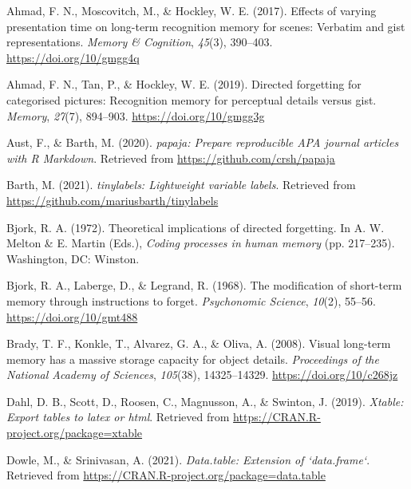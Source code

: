 \documentclass[
  english,
  man,floatsintext]{apa6}
\begin{document}
\begingroup
\setlength{\parindent}{-0.5in}
\setlength{\leftskip}{0.5in}

\hypertarget{refs}{}
\leavevmode\hypertarget{ref-ahmadEffectsVaryingPresentation2017}{}%
Ahmad, F. N., Moscovitch, M., \& Hockley, W. E. (2017). Effects of varying presentation time on long-term recognition memory for scenes: Verbatim and gist representations. \emph{Memory \& Cognition}, \emph{45}(3), 390--403. \url{https://doi.org/10/gmgg4q}

\leavevmode\hypertarget{ref-ahmadDirectedForgettingCategorised2019}{}%
Ahmad, F. N., Tan, P., \& Hockley, W. E. (2019). Directed forgetting for categorised pictures: Recognition memory for perceptual details versus gist. \emph{Memory}, \emph{27}(7), 894--903. \url{https://doi.org/10/gmgg3g}

\leavevmode\hypertarget{ref-R-papaja}{}%
Aust, F., \& Barth, M. (2020). \emph{papaja: Prepare reproducible APA journal articles with R Markdown}. Retrieved from \url{https://github.com/crsh/papaja}

\leavevmode\hypertarget{ref-R-tinylabels}{}%
Barth, M. (2021). \emph{tinylabels: Lightweight variable labels}. Retrieved from \url{https://github.com/mariusbarth/tinylabels}

\leavevmode\hypertarget{ref-bjorkTheoreticalImplicationsDirected1972}{}%
Bjork, R. A. (1972). Theoretical implications of directed forgetting. In A. W. Melton \& E. Martin (Eds.), \emph{Coding processes in human memory} (pp. 217--235). Washington, DC: Winston.

\leavevmode\hypertarget{ref-bjorkModificationShorttermMemory1968}{}%
Bjork, R. A., Laberge, D., \& Legrand, R. (1968). The modification of short-term memory through instructions to forget. \emph{Psychonomic Science}, \emph{10}(2), 55--56. \url{https://doi.org/10/gmt488}

\leavevmode\hypertarget{ref-bradyVisualLongtermMemory2008}{}%
Brady, T. F., Konkle, T., Alvarez, G. A., \& Oliva, A. (2008). Visual long-term memory has a massive storage capacity for object details. \emph{Proceedings of the National Academy of Sciences}, \emph{105}(38), 14325--14329. \url{https://doi.org/10/c268jz}

\leavevmode\hypertarget{ref-R-xtable}{}%
Dahl, D. B., Scott, D., Roosen, C., Magnusson, A., \& Swinton, J. (2019). \emph{Xtable: Export tables to latex or html}. Retrieved from \url{https://CRAN.R-project.org/package=xtable}

\leavevmode\hypertarget{ref-R-data.table}{}%
Dowle, M., \& Srinivasan, A. (2021). \emph{Data.table: Extension of `data.frame`}. Retrieved from \url{https://CRAN.R-project.org/package=data.table}
\end{document}
